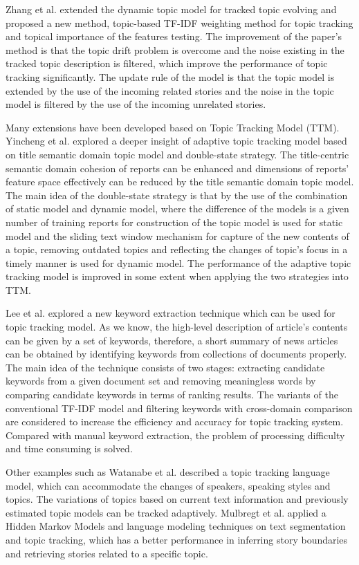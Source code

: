Zhang et al. \cite{zhang2010topic} extended the dynamic topic model for tracked topic evolving and proposed a new method, topic-based TF-IDF weighting method for topic tracking and topical importance of the features testing. The improvement of the paper’s method is that the topic drift problem is overcome and the noise existing in the tracked topic description is filtered, which improve the performance of topic tracking significantly. The update rule of the model is that the topic model is extended by the use of the incoming related stories and the noise in the topic model is filtered by the use of the incoming unrelated stories.

Many extensions have been developed based on Topic Tracking Model (TTM). Yincheng et al. \cite{yincheng2014adaptive} explored a deeper insight of adaptive topic tracking model based on title semantic domain topic model and double-state strategy. The title-centric semantic domain cohesion of reports can be enhanced and dimensions of reports’ feature space effectively can be reduced by the title semantic domain topic model. The main idea of the double-state strategy is that by the use of the combination of static model and dynamic model, where the difference of the models is a given number of training reports for construction of the topic model is used for static model and the sliding text window mechanism for capture of the new contents of a topic, removing outdated topics and reflecting the changes of topic’s focus in a timely manner is used for dynamic model. The performance of the adaptive topic tracking model is improved in some extent when applying the two strategies into TTM. 

Lee et al. \cite{lee2008news} explored a new keyword extraction technique which can be used for topic tracking model. As we know, the high-level description of article’s contents can be given by a set of keywords, therefore, a short summary of news articles can be obtained by identifying keywords from collections of documents properly. The main idea of the technique consists of two stages: extracting candidate keywords from a given document set and removing meaningless words by comparing candidate keywords in terms of ranking results. The variants of the conventional TF-IDF model and filtering keywords with cross-domain comparison are considered to increase the efficiency and accuracy for topic tracking system. Compared with manual keyword extraction, the problem of processing difficulty and time consuming is solved.

Other examples such as Watanabe et al. \cite{watanabe2011topic} described a topic tracking language model, which can accommodate the changes of speakers, speaking styles and topics. The variations of topics based on current text information and previously estimated topic models can be tracked adaptively. Mulbregt et al. \cite{van1998text} applied a Hidden Markov Models and language modeling techniques on text segmentation and topic tracking, which has a better performance in inferring story boundaries and retrieving stories related to a specific topic.

